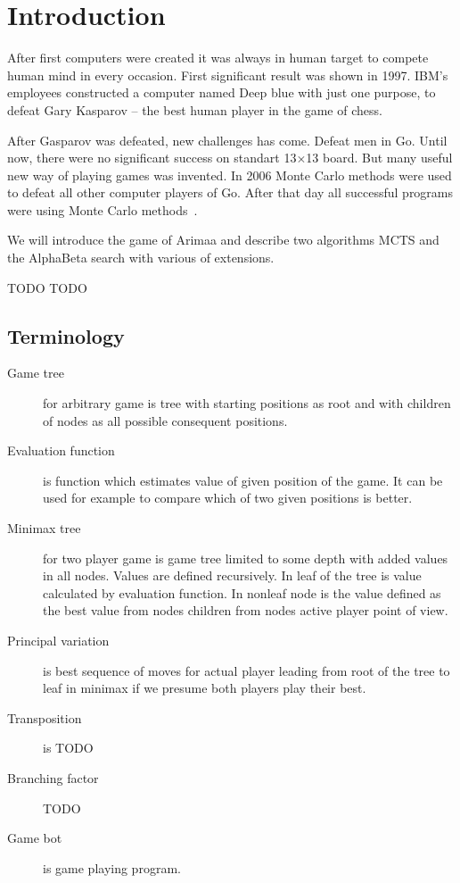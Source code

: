 \chapter{Introduction}
After first computers were created it was always in human target to compete
human mind in every occasion. First significant result was shown in 1997. IBM's
employees constructed a computer named Deep blue with just one purpose, to
defeat Gary Kasparov -- the best human player in the game of chess.

After Gasparov was defeated, new challenges has come. Defeat men in Go. Until
now, there were no significant success on standart 13$\times$13 board. But many
useful new way of playing games was invented. In 2006 Monte Carlo methods were
used to defeat all other computer players of Go. After that day all successful
programs were using Monte Carlo methods~\cite{MoGo}.

We will introduce the game of Arimaa and describe two algorithms \ac{MCTS} and
the AlphaBeta search with various of extensions.

\cite{arimaa.com}

TODO TODO

\section{Terminology}
\begin{description}
\item[Game tree] for arbitrary game is tree with starting positions as root and
   with children of nodes as all possible consequent positions.
\item[Evaluation function] is function which estimates value of given position of the game. It can be used for example to compare which of two given positions is better.
\item[Minimax tree] for two player game is game tree limited to some depth with
added values in all nodes. Values are defined recursively. In leaf of the tree
is value calculated by evaluation function. In nonleaf node is the value
defined as the best value from nodes children from nodes active player point
of view.
\item[Principal variation] is best sequence of moves for actual player leading
from root of the tree to leaf in minimax if we presume both players play their
best.
\item[Transposition] is TODO
\item[Branching factor] TODO
\item[Game bot] is game playing program.
\end{description}

